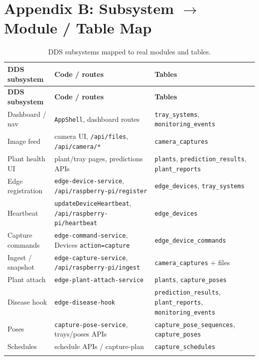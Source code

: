 \documentclass[11pt,letterpaper]{article}
\begin{document}
\section{Appendix B: Subsystem $\rightarrow$ Module / Table Map}
\begin{center}
\begin{longtable}{@{}p{3.4cm}p{5.4cm}p{5.0cm}@{}}
\toprule
\textbf{DDS subsystem} & \textbf{Code / routes} & \textbf{Tables} \\
\midrule
\endfirsthead
\toprule
\textbf{DDS subsystem} & \textbf{Code / routes} & \textbf{Tables} \\
\midrule
\endhead
Dashboard / nav & \texttt{AppShell}, dashboard routes & \texttt{tray\_systems},
  \texttt{monitoring\_events} \\
Image feed & camera UI, \texttt{/api/files}, \texttt{/api/camera/*} &
  \texttt{camera\_captures} \\
Plant health UI & plant/tray pages, predictions APIs & \texttt{plants},
  \texttt{prediction\_results}, \texttt{plant\_reports} \\
Edge registration & \texttt{edge-device-service},
  \texttt{/api/raspberry-pi/register} & \texttt{edge\_devices},
  \texttt{tray\_systems} \\
Heartbeat & \texttt{updateDeviceHeartbeat},
  \texttt{/api/raspberry-pi/heartbeat} & \texttt{edge\_devices} \\
Capture commands & \texttt{edge-command-service},
  Devices \texttt{action=capture} & \texttt{edge\_device\_commands} \\
Ingest / snapshot & \texttt{edge-capture-service},
  \texttt{/api/raspberry-pi/ingest} & \texttt{camera\_captures} + files \\
Plant attach & \texttt{edge-plant-attach-service} & \texttt{plants},
  \texttt{capture\_poses} \\
Disease hook & \texttt{edge-disease-hook} & \texttt{prediction\_results},
  \texttt{plant\_reports}, \texttt{monitoring\_events} \\
Poses & \texttt{capture-pose-service}, trays/poses APIs &
  \texttt{capture\_pose\_sequences}, \texttt{capture\_poses} \\
Schedules & schedule APIs / capture-plan & \texttt{capture\_schedules} \\
\bottomrule
\caption{DDS subsystems mapped to real modules and tables.}
\label{tab:subsystem-map}
\end{longtable}
\end{center}
\end{document}
